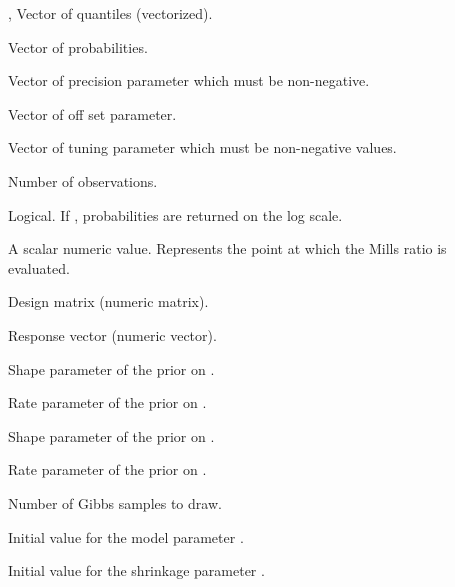 \documentclass[a4paper]{book}
\begin{document}
%
\begin{Arguments}
\begin{ldescription}
\item[\code{x}, \code{q}] Vector of quantiles (vectorized).

\item[\code{p}] Vector of probabilities.

\item[\code{a}] Vector of precision parameter which must be non-negative.

\item[\code{b}] Vector of off set parameter.

\item[\code{c}] Vector of tuning parameter which must be non-negative values.

\item[\code{n}] Number of observations.

\item[\code{logarithm}] Logical. If , probabilities are returned on the log scale.

\item[\code{d}] A scalar numeric value. Represents the point at which the Mills ratio is evaluated.

\item[\code{X}] Design matrix (numeric matrix).

\item[\code{y}] Response vector (numeric vector).

\item[\code{a1}] Shape parameter of the prior on .

\item[\code{b1}] Rate parameter of the prior on .

\item[\code{u1}] Shape parameter of the prior on .

\item[\code{v1}] Rate parameter of the prior on .

\item[\code{nsamples}] Number of Gibbs samples to draw.

\item[\code{beta\_init}] Initial value for the model parameter \eqn{\beta}{}.

\item[\code{lambda\_init}] Initial value for the shrinkage parameter .


\end{ldescription}
\end{Arguments}
\end{document}
